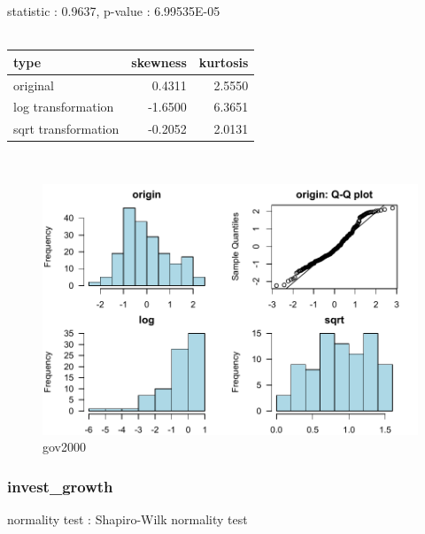 \documentclass{book}\usepackage[]{graphicx}\usepackage[]{color}
\begin{document}
\noindent statistic : 0.9637,  p-value : 6.99535E-05\\
\\%
\begin{tabular}{lrr}
  \toprule
type & skewness & kurtosis \\ 
  \midrule
original & 0.4311 & 2.5550 \\ 
  log transformation & -1.6500 & 6.3651 \\ 
  sqrt transformation & -0.2052 & 2.0131 \\ 
   \bottomrule
\end{tabular}
\\
\begin{figure}[!ht]
\centering
\includegraphics[width=1.0\textwidth]{figure/norm11.pdf}
\caption{gov2000}
\end{figure}
\clearpage
\subsubsection{ invest\_growth }

normality test : Shapiro-Wilk normality test
\end{document}
